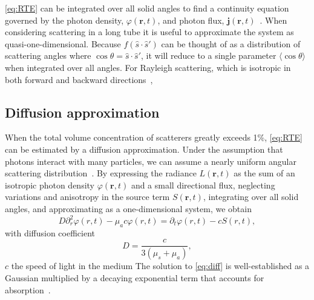 \eqref{eq:RTE} can be integrated over all solid angles to find a continuity equation governed by the photon density, $\varphi\left(\mathbf{r}, t\right)$, and photon flux, $\mathbf{j}\left(\mathbf{r}, t\right)$~\cite{haskell_boundary_1994}. When considering scattering in a long tube it is useful to approximate the system as quasi-one-dimensional.  Because $f\left(\hat{s}\cdot\hat{s}'\right)$ can be thought of as a distribution of scattering angles where $\cos \theta = \hat s \cdot \hat s'$, it will reduce to a single parameter  $\langle\cos{\theta}\rangle$ when integrated over all angles. For Rayleigh scattering, which is isotropic in both forward and backward directions~\cite{bohren_absorption_1983}, 

\subsection{Diffusion approximation}\label{sec:diffusion}

When the total volume concentration of scatterers greatly exceeds 1\%, \eqref{eq:RTE} can be estimated by a diffusion approximation. Under the assumption that photons interact with many particles, we can assume a nearly uniform angular scattering distribution~\cite{ishimaru_wave_1997,bohren_absorption_1983}. By expressing the radiance $L\left(\mathbf{r},t\right)$ as the sum of an isotropic photon density $\varphi\left(\mathbf{r}, t\right)$ and a small directional flux, neglecting variations and anisotropy in the source term $S\left(\mathbf{r},t\right)$, integrating over all solid angles, and approximating as a one-dimensional system, we obtain~\cite{haskell_boundary_1994}
%
\begin{equation}\label{eq:diff}
    D \partial_{r}^{2} \varphi \left(r,t\right) - \mu_{a} c \varphi \left(r,t\right) = \partial_{t} \varphi \left(r,t\right) - c S \left(r,t\right),
\end{equation}
%
with diffusion coefficient
\begin{equation}\label{eq:diffD}
    D = \frac{c}{3\left(\mu_{s} + \mu_{a}\right)},
\end{equation}
$c$  the speed of light in the medium The solution to \eqref{eq:diff} is well-established as a Gaussian multiplied by a decaying exponential term that accounts for absorption~\cite{haskell_boundary_1994}.


